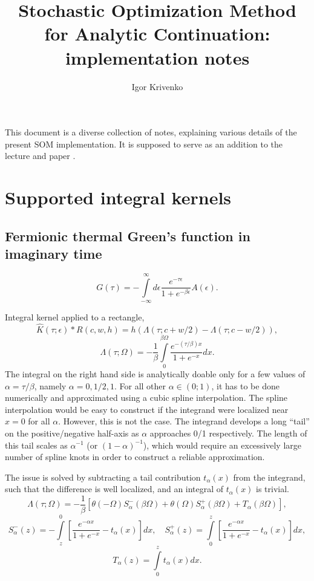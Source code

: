 \documentclass[]{article}
\title{Stochastic Optimization Method for Analytic Continuation: implementation notes}
\author{Igor Krivenko}
\begin{document}
\maketitle

This document is a diverse collection of notes, explaining various details of the present SOM implementation.
It is supposed to serve as an addition to the lecture \cite{som_lecture} and paper \cite{socc_paper}.

\section{Supported integral kernels}
\label{kernels}
\subsection{Fermionic thermal Green's function in imaginary time}
\label{fermiongf_imtime}

\begin{equation}
	G(\tau) = -\int\limits_{-\infty}^\infty
	d\epsilon \frac{e^{-\tau\epsilon}}{1+e^{-\beta\epsilon}} A(\epsilon).
\end{equation}

Integral kernel applied to a rectangle,
\begin{equation}
	\hat K(\tau;\epsilon)*R(c,w,h) =
	h(\Lambda(\tau;c+w/2) - \Lambda(\tau;c-w/2)),
\end{equation}
\begin{equation}
	\Lambda(\tau;\Omega) = -\frac{1}{\beta}
	\int\limits_0^{\beta\Omega}\frac{e^{-(\tau/\beta)x}}{1+e^{-x}}dx.
\end{equation}
The integral on the right hand side is analytically doable only for
a few values of $\alpha=\tau/\beta$, namely $\alpha=0,1/2,1$.
For all other $\alpha\in(0;1)$, it has to be done numerically and approximated using a cubic spline interpolation. The spline interpolation
would be easy to construct if the integrand were localized near $x=0$ for
all $\alpha$. However, this is not the case. The integrand develops
a long ``tail'' on the positive/negative half-axis as $\alpha$ approaches
0/1 respectively. The length of this tail scales as $\alpha^{-1}$ (or $(1-\alpha)^{-1}$), which would require an excessively large number of
spline knots in order to construct a reliable approximation.

The issue is solved by subtracting a tail contribution $t_\alpha(x)$ from the integrand, such that the difference is well localized, and an integral of $t_\alpha(x)$ is trivial.
\begin{equation}
	\Lambda(\tau;\Omega) = -\frac{1}{\beta} \left[
	\theta(-\Omega)S^-_\alpha(\beta\Omega) +
	\theta(\Omega)S^+_\alpha(\beta\Omega) +
	T_\alpha(\beta\Omega)
	\right],
\end{equation}
\begin{equation}
	S^-_\alpha(z) = -\int\limits_z^0
	\left[\frac{e^{-\alpha x}}{1+e^{-x}} - t_\alpha(x)
	\right] dx,\quad
	S^+_\alpha(z) = \int\limits_0^z
	\left[\frac{e^{-\alpha x}}{1+e^{-x}} - t_\alpha(x)
	\right] dx,
\end{equation}
\begin{equation}
	T_\alpha(z) = \int\limits_0^z t_\alpha(x) dx.
\end{equation}
\end{document}
